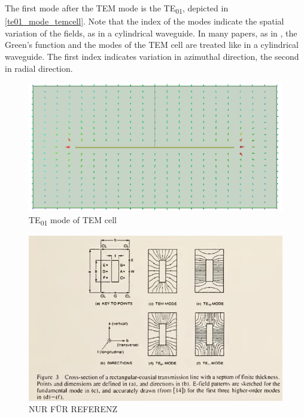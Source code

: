 The first mode after the TEM mode is the TE\textsubscript{01}, depicted in \autoref{te01_mode_temcell}. Note that the index of the modes indicate the spatial variation of the fields, as in a cylindrical waveguide. In many papers, as in \cite{Tippet_Chang_Crawford_1976}, the Green's function and the modes of the TEM cell are treated like in a cylindrical waveguide. The first index indicates variation in azimuthal direction, the second in radial direction.

\begin{figure}[h]
    \centering
    \includegraphics[width=0.5\linewidth]{Documentation//content//10_theory//img/te01_mode_temcell.png}
    \caption{TE\textsubscript{01} mode of TEM cell}
    \label{fig:te01_mode_temcell}
\end{figure}

\begin{figure}[h]
    \centering
    \includegraphics[width=0.5\linewidth]{Documentation//content//10_theory//img/delete_after.png}
    \caption{NUR FÜR REFERENZ}
    \label{fig:placeholder}
\end{figure}

